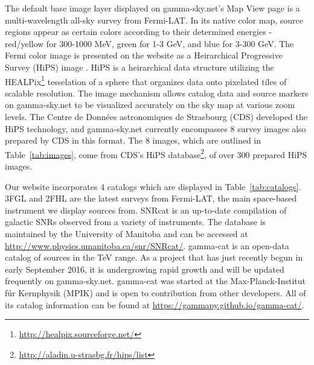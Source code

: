 







    The default base image layer displayed on gamma-sky.net's Map View page is a multi-wavelength all-sky survey from Fermi-LAT. In its native color map, source regions appear as certain colors according to their determined energies - red/yellow for 300-1000 MeV, green for 1-3 GeV, and blue for 3-300 GeV. The Fermi color image is presented on the website as a Heirarchical Progressive Survey (HiPS) image \cite{hips}. HiPS is a heirarchical data structure utilizing the HEALPix\footnote[1]{\url{http://healpix.sourceforge.net/}} tesselation of a sphere that organizes data onto pixelated tiles of scalable resolution. The image mechanism allows catalog data and source markers on gamma-sky.net to be visualized accurately on the sky map at various zoom levels. The Centre de Donn\'{e}es astronomiques de Strasbourg (CDS) developed the HiPS technology, and gamma-sky.net currently encompasses 8 survey images also prepared by CDS in this format. The 8 images, which are outlined in Table~\ref{tab:images}, come from CDS's HiPS database\footnote[2]{\url{http://aladin.u-strasbg.fr/hips/list}}, of over 300 prepared HiPS images.

    Our website incorporates 4 catalogs which are displayed in Table~\ref{tab:catalogs}. 3FGL \cite{3fgl} and 2FHL \cite{2fhl} are the latest surveys from Fermi-LAT, the main space-based instrument we display sources from. SNRcat \cite{snrcat} is an up-to-date compilation of galactic SNRs observed from a variety of instruments. The database is maintained by the University of Manitoba and can be accessed at \url{http://www.physics.umanitoba.ca/snr/SNRcat/}. gamma-cat is an open-data catalog of sources in the TeV range. As a project that has just recently begun in early September 2016, it is undergrowing rapid growth and will be updated frequently on gamma-sky.net. gamma-cat was started at the Max-Planck-Institut f\'{u}r Kernphysik (MPIK) and is open to contribution from other developers. All of its catalog information can be found at \url{https://gammapy.github.io/gamma-cat/}.

